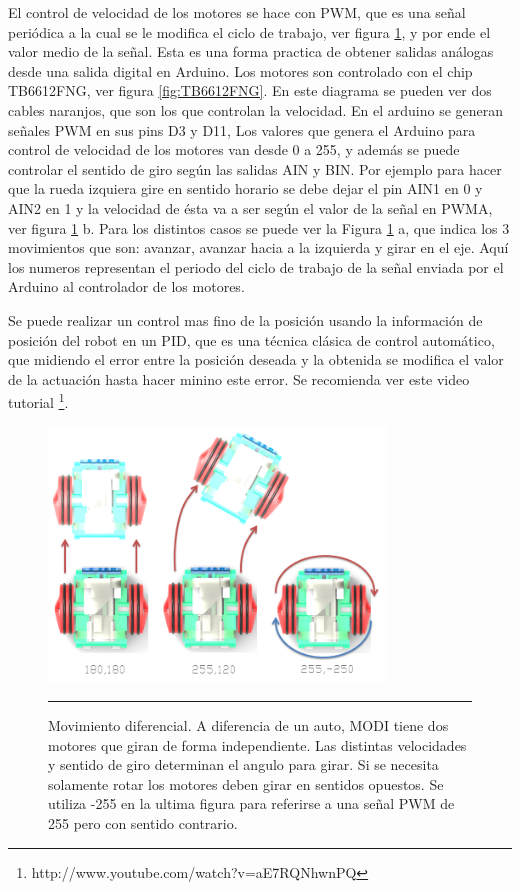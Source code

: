El control de velocidad de los motores se hace con PWM, que es una señal periódica a la cual se le modifica el ciclo de trabajo, ver figura \ref{fig:pwm}, y por ende el valor medio de la señal. Esta es una forma practica de obtener salidas análogas desde una salida digital en Arduino. 
Los motores son controlado con el chip TB6612FNG, ver figura \ref{fig:TB6612FNG}. En este diagrama se pueden ver dos cables naranjos, que son los que controlan la velocidad. En el arduino se generan señales PWM en sus pins D3 y D11, Los valores que genera el Arduino para control de velocidad de los motores van desde 0 a 255, y además se puede controlar el sentido de giro según las salidas AIN y BIN. Por ejemplo para hacer que la rueda izquiera gire en sentido horario se debe dejar el pin AIN1 en 0 y AIN2 en 1 y la velocidad de ésta va a ser según el valor de la señal en PWMA, ver figura \ref{fig:pwm} b. Para los distintos casos se puede ver la Figura \ref{fig:pwm} a, que indica los 3 movimientos que son: avanzar, avanzar hacia a la izquierda y girar en el eje. Aquí los numeros representan el periodo del ciclo de trabajo de la señal enviada por el Arduino al controlador de los motores. 

Se puede realizar un control mas fino de la posición usando la información de posición del robot en un PID, que es una técnica clásica de control automático, que midiendo el error entre la posición deseada y la obtenida se modifica el valor de la actuación hasta hacer minino este error. Se recomienda ver este video tutorial \footnote{http://www.youtube.com/watch?v=aE7RQNhwnPQ}. 

\begin{figure}[htbp]
	\centering
		\includegraphics[width=0.8\textwidth]{./Figures/MODI/pwm.png}
		\rule{35em}{0.5pt}
	\caption[Señal PWM]{Movimiento diferencial. A diferencia de un auto, MODI tiene dos motores que giran de forma independiente. Las distintas velocidades y sentido de giro determinan el angulo para girar. Si se necesita solamente rotar los motores deben girar en sentidos opuestos. Se utiliza -255 en la ultima figura para referirse a una señal PWM de 255 pero con sentido contrario.}
	\label{fig:pwm}
\end{figure}

